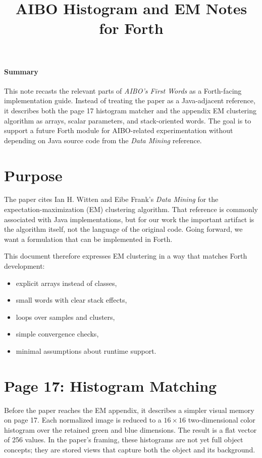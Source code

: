 \documentclass[11pt]{article}
\title{AIBO Histogram and EM Notes for Forth}
\author{}
\date{}
\begin{document}
\maketitle

\paragraph{Summary}
This note recasts the relevant parts of \emph{AIBO's First Words} as a Forth-facing implementation guide. Instead of treating the paper as a Java-adjacent reference, it describes both the page 17 histogram matcher and the appendix EM clustering algorithm as arrays, scalar parameters, and stack-oriented words. The goal is to support a future Forth module for AIBO-related experimentation without depending on Java source code from the \emph{Data Mining} reference.

\section*{Purpose}

The paper cites Ian H. Witten and Eibe Frank's \emph{Data Mining} for the expectation-maximization (EM) clustering algorithm. That reference is commonly associated with Java implementations, but for our work the important artifact is the algorithm itself, not the language of the original code. Going forward, we want a formulation that can be implemented in Forth.

This document therefore expresses EM clustering in a way that matches Forth development:

\begin{itemize}
\item explicit arrays instead of classes,
\item small words with clear stack effects,
\item loops over samples and clusters,
\item simple convergence checks,
\item minimal assumptions about runtime support.
\end{itemize}

\section*{Page 17: Histogram Matching}

Before the paper reaches the EM appendix, it describes a simpler visual memory on page 17. Each normalized image is reduced to a $16 \times 16$ two-dimensional color histogram over the retained green and blue dimensions. The result is a flat vector of 256 values. In the paper's framing, these histograms are not yet full object concepts; they are stored views that capture both the object and its background.
\end{document}
